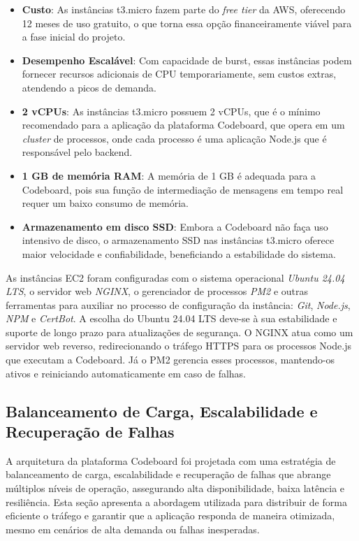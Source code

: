 \begin{itemize}
    \item \textbf{Custo}: As instâncias t3.micro fazem parte do \emph{free tier} da AWS, oferecendo 12 meses de uso gratuito, o que torna essa opção financeiramente viável para a fase inicial do projeto.
    \item \textbf{Desempenho Escalável}: Com capacidade de burst, essas instâncias podem fornecer recursos adicionais de CPU temporariamente, sem custos extras, atendendo a picos de demanda.
    \item \textbf{2 vCPUs}: As instâncias t3.micro possuem 2 vCPUs, que é o mínimo recomendado para a aplicação da plataforma Codeboard, que opera em um \emph{cluster} de processos, onde cada processo é uma aplicação Node.js que é responsável pelo backend.
    \item \textbf{1 GB de memória RAM}: A memória de 1 GB é adequada para a Codeboard, pois sua função de intermediação de mensagens em tempo real requer um baixo consumo de memória.
    \item \textbf{Armazenamento em disco SSD}: Embora a Codeboard não faça uso intensivo de disco, o armazenamento SSD nas instâncias t3.micro oferece maior velocidade e confiabilidade, beneficiando a estabilidade do sistema.
\end{itemize}

As instâncias EC2 foram configuradas com o sistema operacional \emph{Ubuntu 24.04 LTS}, o servidor web \emph{NGINX}, o gerenciador de processos \emph{PM2} e outras ferramentas para auxiliar no processo de configuração da instância: \emph{Git}, \emph{Node.js}, \emph{NPM} e \emph{CertBot}. A escolha do Ubuntu 24.04 LTS deve-se à sua estabilidade e suporte de longo prazo para atualizações de segurança. O NGINX atua como um servidor web reverso, redirecionando o tráfego HTTPS para os processos Node.js que executam a Codeboard. Já o PM2 gerencia esses processos, mantendo-os ativos e reiniciando automaticamente em caso de falhas.

\subsection{Balanceamento de Carga, Escalabilidade e Recuperação de Falhas}

A arquitetura da plataforma Codeboard foi projetada com uma estratégia de balanceamento de carga, escalabilidade e recuperação de falhas que abrange múltiplos níveis de operação, assegurando alta disponibilidade, baixa latência e resiliência. Esta seção apresenta a abordagem utilizada para distribuir de forma eficiente o tráfego e garantir que a aplicação responda de maneira otimizada, mesmo em cenários de alta demanda ou falhas inesperadas.

